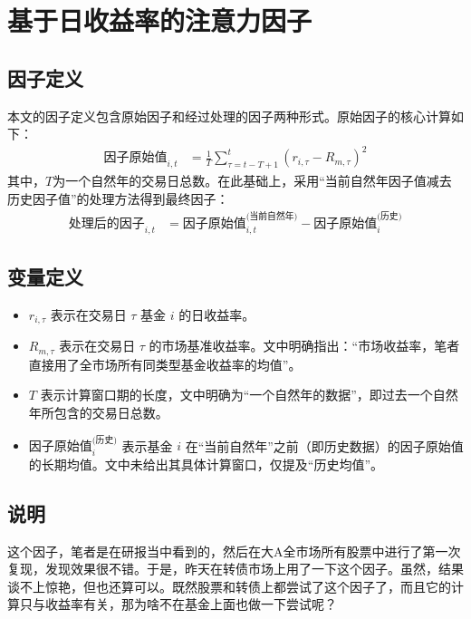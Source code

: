 \documentclass{article}
\begin{document}
\section{基于日收益率的注意力因子}

\subsection{因子定义}
本文的因子定义包含原始因子和经过处理的因子两种形式。原始因子的核心计算如下：
\begin{equation}
\begin{aligned}
\text{因子原始值}_{i, t} &= \frac{1}{T} \sum_{\tau = t-T+1}^{t} (r_{i, \tau} - R_{m, \tau})^2
\end{aligned}
\end{equation}
\vspace{6pt}
其中，$T$为一个自然年的交易日总数。在此基础上，采用“当前自然年因子值减去历史因子值”的处理方法得到最终因子：
\begin{equation}
\begin{aligned}
\text{处理后的因子}_{i, t} &= \text{因子原始值}_{i, t}^{\text{(当前自然年)}} - \text{因子原始值}_{i}^{\text{(历史)}}
\end{aligned}
\end{equation}

\subsection{变量定义}
\begin{itemize}
    \item $r_{i, \tau}$ 表示在交易日 $\tau$ 基金 $i$ 的日收益率。
    \item $R_{m, \tau}$ 表示在交易日 $\tau$ 的市场基准收益率。文中明确指出：“市场收益率，笔者直接用了全市场所有同类型基金收益率的均值”。
    \item $T$ 表示计算窗口期的长度，文中明确为“一个自然年的数据”，即过去一个自然年所包含的交易日总数。
    \item $\text{因子原始值}_{i}^{\text{(历史)}}$ 表示基金 $i$ 在“当前自然年”之前（即历史数据）的因子原始值的长期均值。文中未给出其具体计算窗口，仅提及“历史均值”。
\end{itemize}

\subsection{说明}
这个因子，笔者是在研报当中看到的，然后在大A全市场所有股票中进行了第一次复现，发现效果很不错。于是，昨天在转债市场上用了一下这个因子。虽然，结果谈不上惊艳，但也还算可以。既然股票和转债上都尝试了这个因子了，而且它的计算只与收益率有关，那为啥不在基金上面也做一下尝试呢？
\end{document}
